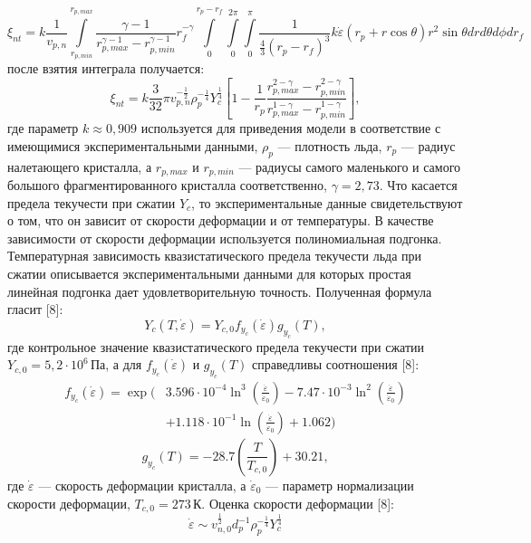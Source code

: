 \begin{equation}
	\xi_{nt} = k \frac{1}{v_{p,n}} \int\limits_{r_{p,min}}^{r_{p,max}} \frac{\gamma-1}{r_{p,max}^{\gamma-1}-r_{p,min}^{\gamma-1}} r_f^{-\gamma} \int\limits_{0}^{r_p-r_f} \int\limits_{0}^{2 \pi} \int\limits_{0}^{\pi} \frac{1}{\frac{4}{3}(r_p-r_f)^3} k \dot{\varepsilon} (r_p+r\cos \theta) r^2 \sin \theta dr d\theta d\phi dr_f
\end{equation}
после взятия интеграла получается:
\begin{equation}
	\xi_{nt} = k \frac{3}{32}\pi v_{p,n}^{-\frac{1}{2}} \rho_p^{-\frac{1}{4}} Y_c^{\frac{1}{4}}\left[1-\frac{1}{r_p}\frac{r_{p,max}^{2-\gamma}-r_{p,min}^{2-\gamma}}{r_{p,max}^{1-\gamma}-r_{p,min}^{1-\gamma}}\right],
\end{equation}
где параметр $k \approx 0{,}909$ используется для приведения модели в соответствие с имеющимися экспериментальными данными, $\rho_p$ --- плотность льда, $r_p$ --- радиус налетающего кристалла, а $r_{p,max}$ и $r_{p,min}$ --- радиусы самого маленького и самого большого фрагментированного кристалла соответственно, $\gamma = 2{,}73$. Что касается предела текучести при сжатии $Y_c$, то экспериментальные данные
свидетельствуют о том, что он зависит от скорости деформации и от температуры. В качестве зависимости от скорости деформации используется полиномиальная подгонка. Температурная зависимость
квазистатического предела текучести льда при сжатии описывается
экспериментальными данными для которых простая
линейная подгонка дает удовлетворительную точность. Полученная формула гласит [8]:
\begin{equation}
	Y_c(T,\dot{\varepsilon})=Y_{c,0} f_{y_c}(\dot{\varepsilon}) g_{y_c}(T),
\end{equation}
где контрольное значение квазистатического предела текучести при сжатии $Y_{c,0} = 5{,}2 \cdot 10^{6}\,\text{Па}$, а для $f_{y_c}(\dot{\varepsilon})$ и $g_{y_c}(T)$ справедливы соотношения [8]:
\begin{equation}
	\begin{split}
		f_{y_c}(\dot{\varepsilon}) = \exp\bigg(
		&3.596 \cdot 10^{-4} \ln^3 \left(\frac{\dot{\varepsilon}}{\dot{\varepsilon}_0}\right) 
		-7.47 \cdot 10^{-3} \ln^2 \left(\frac{\dot{\varepsilon}}{\dot{\varepsilon}_0}\right) \\
		&+1.118 \cdot 10^{-1} \ln \left(\frac{\dot{\varepsilon}}{\dot{\varepsilon}_0}\right)
		+1.062 \bigg)
	\end{split}
\end{equation}
\begin{equation}
	g_{y_c}(T)=-28.7\left(\frac{T}{T_{c,0}}\right)+30.21,
\end{equation}
где $\dot{\varepsilon}$ --- скорость деформации кристалла, а $\dot{\varepsilon}_0$ --- параметр нормализации скорости деформации, $T_{c,0}=273\, \text{К}$. Оценка скорости деформации [8]: 
\begin{equation}
	\dot{\varepsilon} \sim v_{n,0}^{\frac{1}{2}} d_p^{-1} \rho_p^{-\frac{1}{4}} Y_c^{\frac{1}{4}}
\end{equation}

